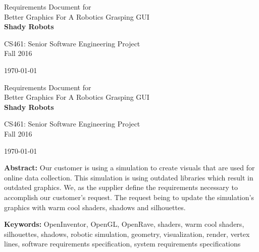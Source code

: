\documentclass[10pt,journal,compsoc]{IEEEtran}
\begin{document}
\onecolumn

\begin{titlepage}
\null
\vspace{35mm}

\begin{flushleft}
\begin{bfseries}
	\vskip2mm
	\Huge{Requirements Document for\\ Better Graphics For A Robotics Grasping GUI}\\
	\vspace{30mm}
	\textbf{\huge Shady Robots} \\
	
\end{bfseries}

\vspace{15mm}
\Large{CS461: Senior Software Engineering Project} \\
\Large{Fall 2016} \\

\vspace{10mm}

\today

\end{flushleft}

\newpage
\null
\vspace{35mm}

\begin{flushleft}
\begin{bfseries}
	\vskip2mm
	\Huge{Requirements Document for\\ Better Graphics For A Robotics Grasping GUI}\\
	\vspace{30mm}
	\textbf{\huge Shady Robots} \\
	
\end{bfseries}

\vspace{15mm}
\Large{CS461: Senior Software Engineering Project} \\
\Large{Fall 2016} \\

\vspace{10mm}

\today

\vfill

\begin{normalsize}
{\bf Abstract:}
Our customer is using a simulation to create visuals that are used for online data collection.
This simulation is using outdated libraries which result in outdated graphics.
We, as the supplier define the requirements necessary to accomplish our customer's request.
The request being to update the simulation's graphics with warm cool shaders, shadows and silhouettes.

{\bf Keywords:} OpenInventor, OpenGL, OpenRave, shaders, warm cool shaders, silhouettes, shadows, robotic simulation, geometry, visualization, render,
vertex lines, software requirements specification, system requirements specifications
\end{normalsize}
\end{flushleft}

\newpage

\end{titlepage}
\end{document}
